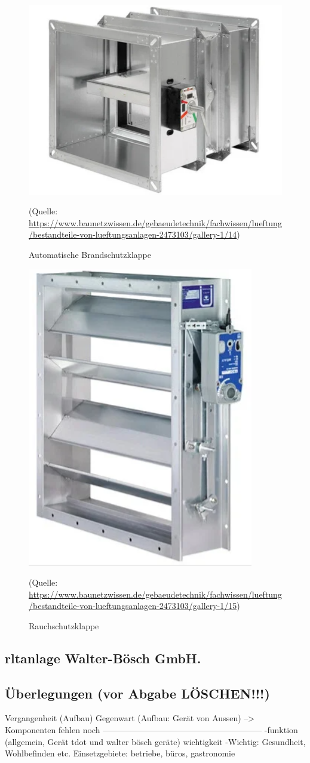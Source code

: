 \begin{figure}[H]
	\centering
	\includegraphics[width=0.5\linewidth]{Bilder/brandschutzklappe}
	\caption{Automatische Brandschutzklappe} 
	(Quelle: \url{	https://www.baunetzwissen.de/gebaeudetechnik/fachwissen/lueftung/bestandteile-von-lueftungsanlagen-2473103/gallery-1/14})
	\label{fig:Brandschutzklappe}
\end{figure}

\begin{figure}[H]
	\centering
	\includegraphics[width=0.5\linewidth]{Bilder/rauchschutzklappe}
	\caption{Rauchschutzklappe} 
	(Quelle: \url{	https://www.baunetzwissen.de/gebaeudetechnik/fachwissen/lueftung/bestandteile-von-lueftungsanlagen-2473103/gallery-1/15})
	\label{fig:Rauchschutzklappe}
\end{figure}

\cite[vgl.][]{baunetz_bestandteile_nodate:o.J.}


\subsection{\ac{rltanlage} Walter-Bösch GmbH.}




\subsection{Überlegungen (vor Abgabe LÖSCHEN!!!)} 

Vergangenheit (Aufbau)
Gegenwart (Aufbau: Gerät von Aussen) --> Komponenten fehlen noch
---------------------------------------------------------
-funktion (allgemein, Gerät tdot und walter bösch geräte)
wichtigkeit 
-Wichtig: Gesundheit, Wohlbefinden etc.
Einsetzgebiete: betriebe, büros, gastronomie

